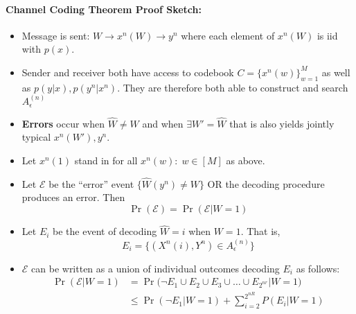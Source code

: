 \documentclass[a4paper,12pt]{report}
\begin{document}
\paragraph{Channel Coding Theorem Proof Sketch: } 
\begin{itemize}
\item Message is sent: $W \to x^n(W) \to y^n$ where each element of $x^n(W)$ is
iid with $p(x)$.
\item Sender and receiver both have access to codebook $C = \{x^n(w)\}_{w=1}^M$
as well as $p(y|x), p(y^n | x^n)$. They are therefore both able to construct and
search $A_\epsilon^{(n)}$
\item \textbf{Errors} occur when $\hat W \neq W$ and when $\exists W' = \hat W$ that is
also yields jointly typical $x^n(W'), y^n$.
\item Let $x^n(1)$ stand in for all $x^n(w):\; w\in [M]$ as above.
\item Let $\mathcal E$ be the ``error'' event $\{\hat W(y^n) \neq
W\}$ OR the decoding procedure produces an error. Then 
	\begin{equation}
		\Pr(\mathcal E) = \Pr(\mathcal E | W = 1)
	\end{equation}

\item Let $E_i$ be the event of decoding $\hat W = i$ when $W = 1$. That is, 
	\begin{equation}
		E_i = \{(X^n(i), Y^n) \in A_\epsilon^{(n)}\}
	\end{equation}
	
\item $\mathcal E$ can be written as a union of individual outcomes decoding $E_i$ as
follows: 
	\begin{align}
		\Pr(\mathcal E | W = 1) &= \Pr \big( \neg E_1 \cup E_2 \cup E_3 \cup
		\dots \cup E_{2^{nr}} | W = 1 \big) \\
		&\leq \Pr(\neg E_1 | W = 1) + \sum_{i=2}^{2^{nR}} P(E_i | W = 1)
	\end{align}


\end{itemize}
\end{document}

